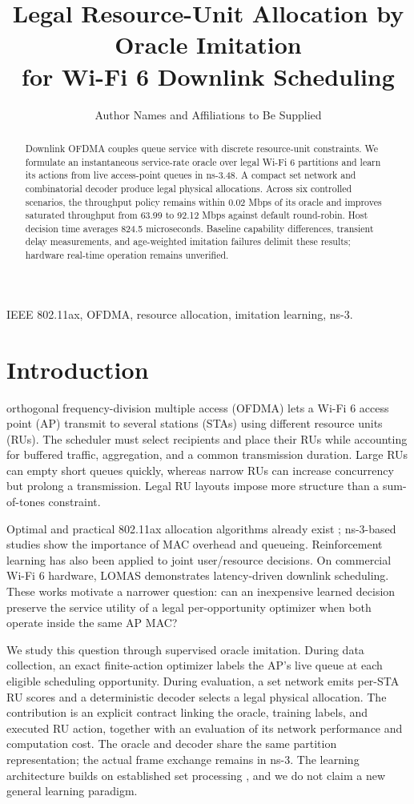 \documentclass[10pt,journal,onecolumn]{IEEEtran}
\title{Legal Resource-Unit Allocation by Oracle Imitation\protect\\
for Wi-Fi 6 Downlink Scheduling}
\author{Author Names and Affiliations to Be Supplied}
\begin{document}
\maketitle
\begin{abstract}
Downlink OFDMA couples queue service with discrete resource-unit constraints.
We formulate an instantaneous service-rate oracle over legal Wi-Fi 6 partitions
and learn its actions from live access-point queues in ns-3.48. A compact set
network and combinatorial decoder produce legal physical allocations. Across
six controlled scenarios, the throughput policy remains within 0.02 Mbps of
its oracle and improves saturated throughput from 63.99 to 92.12 Mbps against
default round-robin. Host decision time averages 824.5 microseconds. Baseline
capability differences, transient delay measurements, and age-weighted imitation
failures delimit these results; hardware real-time operation remains unverified.
\end{abstract}
\begin{IEEEkeywords}
IEEE 802.11ax, OFDMA, resource allocation, imitation learning, ns-3.
\end{IEEEkeywords}

\section{Introduction}
 orthogonal frequency-division multiple access (OFDMA)
lets a Wi-Fi 6 access point (AP) transmit to several stations (STAs) using
different resource units (RUs). The scheduler must select recipients and place
their RUs while accounting for buffered traffic, aggregation, and a common
transmission duration. Large RUs can empty short queues quickly, whereas narrow
RUs can increase concurrency but prolong a transmission. Legal RU layouts
impose more structure than a sum-of-tones constraint.

Optimal and practical 802.11ax allocation algorithms already exist
\cite{wang2020efficient,mmru2020}; ns-3-based studies show the importance of
MAC overhead and queueing\cite{magrin2023performance}. Reinforcement learning
has also been applied to joint user/resource decisions\cite{noh2024joint}.
On commercial Wi-Fi 6 hardware, LOMAS demonstrates latency-driven downlink
scheduling\cite{tai2025lomas}. These works motivate a narrower question:
can an inexpensive learned decision preserve the service utility of a legal
per-opportunity optimizer when both operate inside the same AP MAC?

We study this question through supervised oracle imitation. During data
collection, an exact finite-action optimizer labels the AP's live queue at
each eligible scheduling opportunity. During evaluation, a set network emits
per-STA RU scores and a deterministic decoder selects a legal physical
allocation. The contribution is an explicit contract linking the oracle,
training labels, and executed RU action, together with an evaluation of its
network performance and computation cost. The oracle and decoder share the
same partition representation; the actual frame exchange remains in ns-3.
The learning architecture builds on established set processing
\cite{zaheer2017deep}, and we do not claim a new general learning paradigm.
\end{document}
